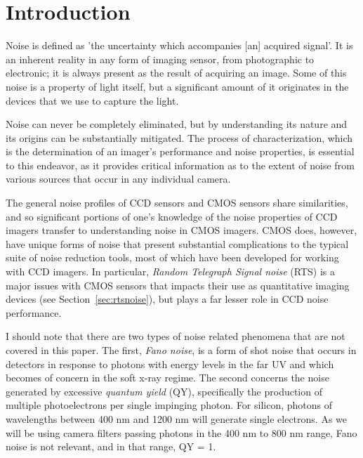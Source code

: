 \documentclass[10pt]{article}
\begin{document}
\newpage


\tableofcontents

\newpage


\section{Introduction}

Noise is defined as 'the uncertainty which accompanies [an] acquired signal'\cite{website:teldyne24}. It is an inherent reality in any form of imaging sensor, from photographic to electronic; it is always present as the result of acquiring an image. Some of this noise is a property of light itself, but a significant amount of it originates in the devices that we use to capture the light.

Noise can never be completely eliminated, but by understanding its nature and its origins can be substantially mitigated. The process of characterization, which is the determination of an imager's performance and noise properties, is essential to this endeavor, as it provides critical information as to the extent of noise from various sources that occur in any individual camera. 

The general noise profiles of CCD sensors and CMOS sensors share similarities, and so significant portions of one's knowledge of the noise properties of CCD imagers transfer to understanding noise in CMOS imagers. CMOS does, however, have unique forms of noise that present substantial complications to the typical suite of noise reduction tools, most of which have been developed for working with CCD imagers. In particular, \emph{Random Telegraph Signal noise} (RTS) is a  major issues with CMOS sensors that impacts their use as quantitative imaging devices (see Section~\ref{sec:rtsnoise}), but plays a far lesser role in CCD noise performance.

I should note that there are two types of noise related phenomena that are not covered in this paper. The first, \emph{Fano noise}, is a form of shot noise that occurs in detectors in response to photons with energy levels in the far UV and which becomes of concern in the soft x-ray regime. The second concerns the noise generated by excessive \emph{quantum yield} (QY), specifically the production of multiple photoelectrons per single impinging photon. For silicon, photons of wavelengths between 400 nm and 1200 nm will generate single electrons. As we will be using camera filters passing photons in the 400 nm to 800 nm range, Fano noise is not relevant, and in that range, QY = 1.
\end{document}
